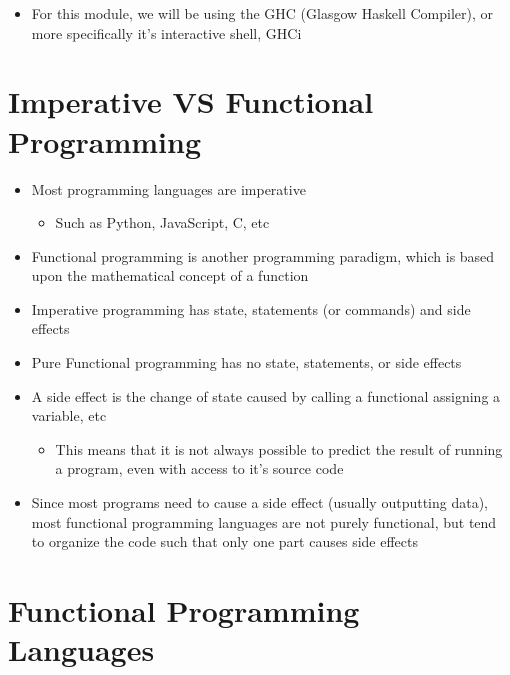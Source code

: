 
\begin{itemize}
  \item For this module, we will be using the GHC (Glasgow Haskell Compiler), or more specifically it's interactive shell, GHCi
\end{itemize}

\section*{Imperative VS Functional Programming}

\begin{itemize}
  \item Most programming languages are imperative
  \begin{itemize}
    \item Such as Python, JavaScript, C, etc
  \end{itemize}
  \item Functional programming is another programming paradigm, which is based upon the mathematical concept of a function
  \item Imperative programming has state, statements (or commands) and side effects
  \item Pure Functional programming has no state, statements, or side effects
  \item A side effect is the change of state caused by calling a functional assigning a variable, etc
  \begin{itemize}
    \item This means that it is not always possible to predict the result of running a program, even with access to it's
    source code
  \end{itemize}
\end{itemize}

\begin{itemize}
  \item Since most programs need to cause a side effect (usually outputting data), most functional programming languages are
  not purely functional, but tend to organize the code such that only one part causes side effects
\end{itemize}

\section*{Functional Programming Languages}

